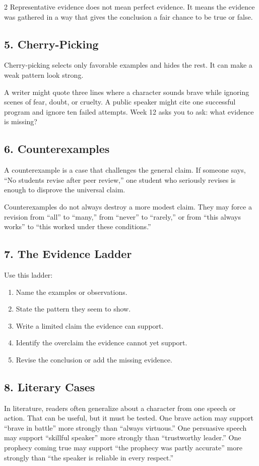 \documentclass[12pt]{article}
\begin{document}
\begin{multicols}{2}
Representative evidence does not mean perfect evidence. It means the evidence was gathered in a way that gives the conclusion a fair chance to be true or false.

\subsection*{5. Cherry-Picking}
Cherry-picking selects only favorable examples and hides the rest. It can make a weak pattern look strong.

A writer might quote three lines where a character sounds brave while ignoring scenes of fear, doubt, or cruelty. A public speaker might cite one successful program and ignore ten failed attempts. Week 12 asks you to ask: what evidence is missing?

\subsection*{6. Counterexamples}
A counterexample is a case that challenges the general claim. If someone says, ``No students revise after peer review,'' one student who seriously revises is enough to disprove the universal claim.

Counterexamples do not always destroy a more modest claim. They may force a revision from ``all'' to ``many,'' from ``never'' to ``rarely,'' or from ``this always works'' to ``this worked under these conditions.''

\subsection*{7. The Evidence Ladder}
Use this ladder:
\begin{enumerate}[leftmargin=*,itemsep=0.12em]
\item Name the examples or observations.
\item State the pattern they seem to show.
\item Write a limited claim the evidence can support.
\item Identify the overclaim the evidence cannot yet support.
\item Revise the conclusion or add the missing evidence.
\end{enumerate}

\subsection*{8. Literary Cases}
In literature, readers often generalize about a character from one speech or action. That can be useful, but it must be tested. One brave action may support ``brave in battle'' more strongly than ``always virtuous.'' One persuasive speech may support ``skillful speaker'' more strongly than ``trustworthy leader.'' One prophecy coming true may support ``the prophecy was partly accurate'' more strongly than ``the speaker is reliable in every respect.''


\end{multicols}
\end{document}
